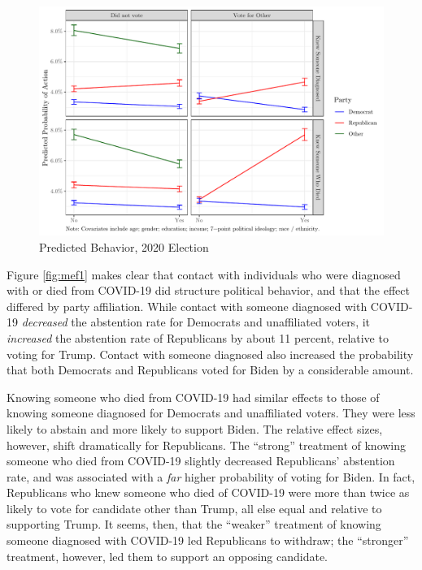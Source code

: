 \documentclass[
  12pt,
]{article}
\begin{document}
\begin{figure}[!htbp]

{\centering \includegraphics{theory_paper_files/figure-latex/mef1-c-1} 

}

\caption{\label{fig:mef1}Predicted Behavior, 2020 Election}\label{fig:mef1-c}
\end{figure}

Figure \ref{fig:mef1} makes clear that contact with individuals who were diagnosed with or died from COVID-19 did structure political behavior, and that the effect differed by party affiliation. While contact with someone diagnosed with COVID-19 \emph{decreased} the abstention rate for Democrats and unaffiliated voters, it \emph{increased} the abstention rate of Republicans by about 11 percent, relative to voting for Trump. Contact with someone diagnosed also increased the probability that both Democrats and Republicans voted for Biden by a considerable amount.

Knowing someone who died from COVID-19 had similar effects to those of knowing someone diagnosed for Democrats and unaffiliated voters. They were less likely to abstain and more likely to support Biden. The relative effect sizes, however, shift dramatically for Republicans. The ``strong'' treatment of knowing someone who died from COVID-19 slightly decreased Republicans' abstention rate, and was associated with a \emph{far} higher probability of voting for Biden. In fact, Republicans who knew someone who died of COVID-19 were more than twice as likely to vote for candidate other than Trump, all else equal and relative to supporting Trump. It seems, then, that the ``weaker'' treatment of knowing someone diagnosed with COVID-19 led Republicans to withdraw; the ``stronger'' treatment, however, led them to support an opposing candidate.
\end{document}
